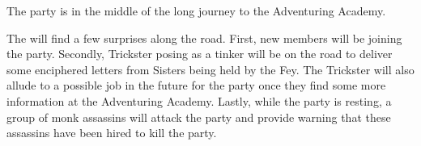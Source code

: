 The party is in the middle of the long journey to the Adventuring Academy.

The will find a few surprises along the road.
First, new members will be joining the party.
Secondly, Trickster posing as a tinker will be on the road to deliver some enciphered letters from Sisters being held by the Fey.
The Trickster will also allude to a possible job in the future for the party once they find some more information at the Adventuring Academy.
Lastly, while the party is resting, a group of monk assassins will attack the party and provide warning that these assassins have been hired to kill the party.
